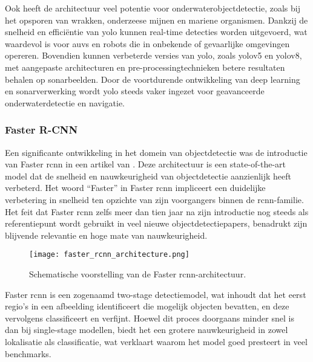 Ook heeft de architectuur veel potentie voor onderwaterobjectdetectie, zoals bij het opsporen van wrakken, onderzeese mijnen en mariene organismen. Dankzij de snelheid en efficiëntie van \gls{yolo} kunnen real-time detecties worden uitgevoerd, wat waardevol is voor \glspl{auv} en robots die in onbekende of gevaarlijke omgevingen opereren. Bovendien kunnen verbeterde versies van \gls{yolo}, zoals \gls{yolo}v5 en \gls{yolo}v8, met aangepaste architecturen en pre-processingtechnieken betere resultaten behalen op sonarbeelden. Door de voortdurende ontwikkeling van deep learning en sonarverwerking wordt \gls{yolo} steeds vaker ingezet voor geavanceerde onderwaterdetectie en navigatie. \autocite{Chen_2023}

\subsubsection{Faster R-CNN}

Een significante ontwikkeling in het domein van objectdetectie was de introductie van Faster \gls{rcnn} in een artikel van \textcite{Ren_2015}. Deze architectuur is een state-of-the-art model dat de snelheid en nauwkeurigheid van objectdetectie aanzienlijk heeft verbeterd. Het woord ``Faster'' in Faster \gls{rcnn} impliceert een duidelijke verbetering in snelheid ten opzichte van zijn voorgangers binnen de \gls{rcnn}-familie. Het feit dat Faster \gls{rcnn} zelfs meer dan tien jaar na zijn introductie nog steeds als referentiepunt wordt gebruikt in veel nieuwe objectdetectiepapers, benadrukt zijn blijvende relevantie en hoge mate van nauwkeurigheid.

\begin{figure}[H]
    \centering
    \texttt{[image: faster\_rcnn\_architecture.png]}
    \caption[Faster R-CNN-architectuur.]{\label{fig:faster_rcnn_architecture}Schematische voorstelling van de Faster \gls{rcnn}-architectuur. \autocite{Ren_2015}}
\end{figure}

\clearpage

Faster \gls{rcnn} is een zogenaamd two-stage detectiemodel, wat inhoudt dat het eerst regio’s in een afbeelding identificeert die mogelijk objecten bevatten, en deze vervolgens classificeert en verfijnt. Hoewel dit proces doorgaans minder snel is dan bij single-stage modellen, biedt het een grotere nauwkeurigheid in zowel lokalisatie als classificatie, wat verklaart waarom het model goed presteert in veel benchmarks. \\

